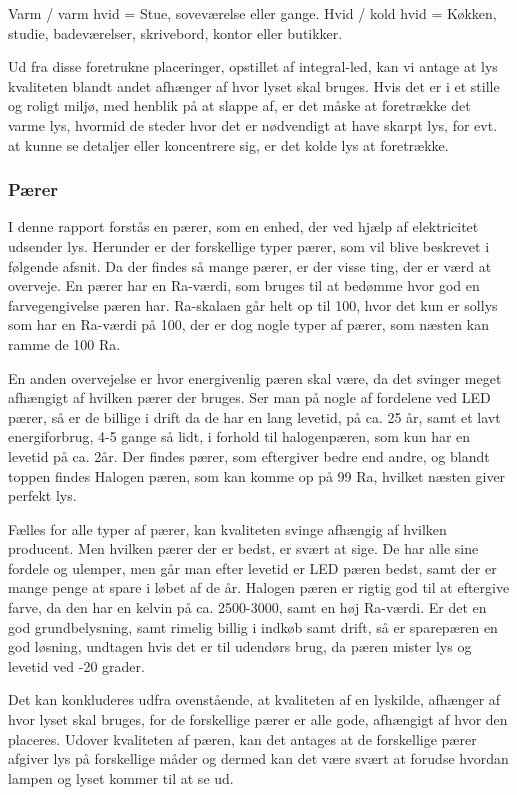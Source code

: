 Varm / varm hvid = Stue, soveværelse eller gange.
Hvid / kold hvid = Køkken, studie, badeværelser, skrivebord, kontor eller butikker\cite{varm_kold}.

Ud fra disse foretrukne placeringer, opstillet af integral-led, kan vi antage at lys kvaliteten blandt andet afhænger af hvor lyset skal bruges. Hvis det er i et stille og roligt miljø, med henblik på at slappe af, er det måske at foretrække det varme lys, hvormid de steder hvor det er nødvendigt at have skarpt lys, for evt. at kunne se detaljer eller koncentrere sig, er det kolde lys at foretrække.

\subsubsection{Pærer}
I denne rapport forstås en pærer, som en enhed, der ved hjælp af elektricitet udsender lys. Herunder er der forskellige typer pærer, som vil blive beskrevet i følgende afsnit.
Da der findes så mange pærer, er der visse ting, der er værd at overveje. En pærer har en Ra-værdi, som bruges til at bedømme hvor god en farvegengivelse pæren har. Ra-skalaen går helt op til 100, hvor det kun er sollys som har en Ra-værdi på 100, der er dog nogle typer af pærer, som næsten kan ramme de 100 Ra.\cite{halogen_paere}

En anden overvejelse er hvor energivenlig pæren skal være, da det svinger meget afhængigt af hvilken pærer der bruges. Ser man på nogle af fordelene ved LED pærer, så er de billige i drift da de har en lang levetid, på ca. 25 år, samt et lavt energiforbrug\cite{LED}, 4-5 gange så lidt, i forhold til halogenpæren, som kun har en levetid på ca. 2år\cite{vaelg_paere}. 
Der findes pærer, som eftergiver bedre end andre, og blandt toppen findes Halogen pæren, som kan komme op på 99 Ra, hvilket næsten giver perfekt lys\cite{halogen_paere}. 

Fælles for alle typer af pærer, kan kvaliteten svinge afhængig af hvilken producent. Men hvilken pærer der er bedst, er svært at sige. De har alle sine fordele og ulemper, men går man efter levetid er LED pæren bedst, samt der er mange penge at spare i løbet af de år. Halogen pæren er rigtig god til at eftergive farve, da den har en kelvin på ca. 2500-3000, samt en høj Ra-værdi. Er det en god grundbelysning, samt rimelig billig i indkøb samt drift, så er sparepæren en god løsning, undtagen hvis det er til udendørs brug, da pæren mister lys og levetid ved -20 grader\cite{sparepaerer}.

Det kan konkluderes udfra ovenstående, at kvaliteten af en lyskilde, afhænger af hvor lyset skal bruges, for de forskellige pærer er alle gode, afhængigt af hvor den placeres. Udover kvaliteten af pæren, kan det antages at de forskellige pærer afgiver lys på forskellige måder og dermed kan det være svært at forudse hvordan lampen og lyset kommer til at se ud.  


